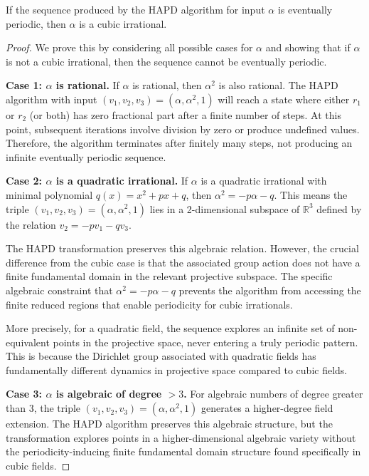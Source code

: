 \begin{theorem}\label{thm:only_cubic_periodic}
If the sequence produced by the HAPD algorithm for input $\alpha$ is eventually periodic, then $\alpha$ is a cubic irrational.
\end{theorem}

\begin{proof}
We prove this by considering all possible cases for $\alpha$ and showing that if $\alpha$ is not a cubic irrational, then the sequence cannot be eventually periodic.

\textbf{Case 1: $\alpha$ is rational.} If $\alpha$ is rational, then $\alpha^2$ is also rational. The HAPD algorithm with input $(v_1, v_2, v_3) = (\alpha, \alpha^2, 1)$ will reach a state where either $r_1$ or $r_2$ (or both) has zero fractional part after a finite number of steps. At this point, subsequent iterations involve division by zero or produce undefined values. Therefore, the algorithm terminates after finitely many steps, not producing an infinite eventually periodic sequence.

\textbf{Case 2: $\alpha$ is a quadratic irrational.} If $\alpha$ is a quadratic irrational with minimal polynomial $q(x) = x^2 + px + q$, then $\alpha^2 = -p\alpha - q$. This means the triple $(v_1, v_2, v_3) = (\alpha, \alpha^2, 1)$ lies in a 2-dimensional subspace of $\mathbb{R}^3$ defined by the relation $v_2 = -pv_1 - qv_3$.

The HAPD transformation preserves this algebraic relation. However, the crucial difference from the cubic case is that the associated group action does not have a finite fundamental domain in the relevant projective subspace. The specific algebraic constraint that $\alpha^2 = -p\alpha - q$ prevents the algorithm from accessing the finite reduced regions that enable periodicity for cubic irrationals.

More precisely, for a quadratic field, the sequence explores an infinite set of non-equivalent points in the projective space, never entering a truly periodic pattern. This is because the Dirichlet group associated with quadratic fields has fundamentally different dynamics in projective space compared to cubic fields.

\textbf{Case 3: $\alpha$ is algebraic of degree $> 3$.} For algebraic numbers of degree greater than 3, the triple $(v_1, v_2, v_3) = (\alpha, \alpha^2, 1)$ generates a higher-degree field extension. The HAPD algorithm preserves this algebraic structure, but the transformation explores points in a higher-dimensional algebraic variety without the periodicity-inducing finite fundamental domain structure found specifically in cubic fields.


\end{proof}
